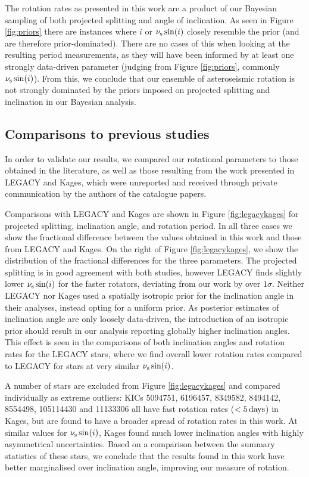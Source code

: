\documentclass[12pt]{article}
\begin{document}
The rotation rates as presented in this work are a product of our Bayesian sampling of both projected splitting and angle of inclination. As seen in Figure \ref{fig:priors} there are instances where $i$ or $\nu_{\rm s}\sin(i)$ closely resemble the prior (and are therefore prior-dominated). There are no cases of this when looking at the resulting period measurements, as they will have been informed by at least one strongly data-driven parameter (judging from Figure \ref{fig:priors}, commonly $\nu_{\rm s}\sin(i)$). From this, we conclude that our ensemble of asteroseismic rotation is not strongly dominated by the priors imposed on projected splitting and inclination in our Bayesian analysis.

\subsection{Comparisons to previous studies}\label{ssec:litcomp}
In order to validate our results, we compared our rotational parameters to those obtained in the literature, as well as those resulting from the work presented in LEGACY and Kages, which were unreported and received through private communication by the authors of the catalogue papers.

Comparisons with LEGACY and Kages are shown in Figure \ref{fig:legacykages} for projected splitting, inclination angle, and rotation period. In all three cases we show the fractional difference between the values obtained in this work and those from LEGACY and Kages. On the right of Figure \ref{fig:legacykages}, we show the distribution of the fractional differences for the three parameters.
The projected splitting is in good agreement with both studies, however LEGACY finds slightly lower $\nu_{\rm s}\sin(i)$ for the faster rotators, deviating from our work by over $1\sigma$. Neither LEGACY nor Kages used a spatially isotropic prior for the inclination angle in their analyses, instead opting for a uniform prior. As posterior estimates of inclination angle are only loosely data-driven, the introduction of an isotropic prior should result in our analysis reporting globally higher inclination angles. This effect is seen in the comparisons of both inclination angles and rotation rates for the LEGACY stars, where we find overall lower rotation rates compared to LEGACY for stars at very similar $\nu_{\rm s}\sin(i)$.

A number of stars are excluded from Figure \ref{fig:legacykages} and compared individually as extreme outliers: KICs 5094751, 6196457, 8349582, 8494142, 8554498, 105114430 and 11133306 all have fast rotation rates ($<5\, \rm days$) in Kages, but are found to have a broader spread of rotation rates in this work. At similar values for $\nu_{\rm s}\sin(i)$, Kages found much lower inclination angles with highly asymmetrical uncertainties. Based on a comparison between the summary statistics of these stars, we conclude that the results found in this work have better marginalised over inclination angle, improving our measure of rotation.
\end{document}
